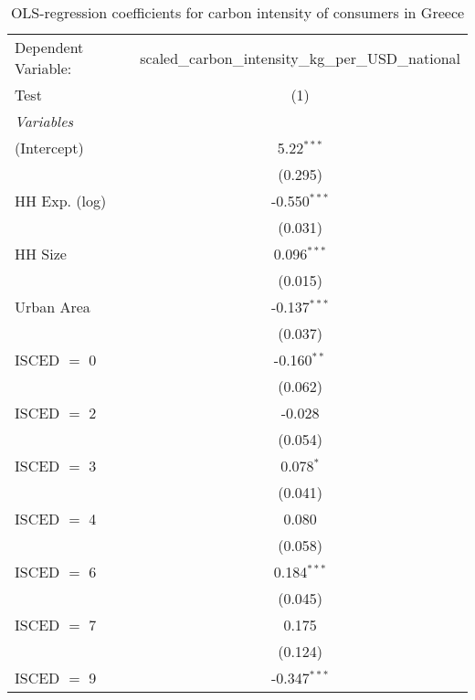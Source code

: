 
\begin{table}[htbp!]
   \centering
   \small
   \begin{adjustbox}{width = 1\textwidth, max height = 0.95\textheight, center}
      \begin{threeparttable}[b]
         \caption{\label{tab:OLS_1_GRC} OLS-regression coefficients for carbon intensity of consumers in Greece}
         \begin{tabular}{lc}
            \tabularnewline \midrule \midrule
            Dependent Variable: & scaled\_carbon\_intensity\_kg\_per\_USD\_national\\        
            Test                & (1)\\  
            \midrule
            \emph{Variables}\\
            (Intercept)         & 5.22$^{***}$\\   
                                & (0.295)\\   
            HH Exp. (log)       & -0.550$^{***}$\\   
                                & (0.031)\\   
            HH Size             & 0.096$^{***}$\\   
                                & (0.015)\\   
            Urban Area          & -0.137$^{***}$\\   
                                & (0.037)\\   
            ISCED $=$ 0         & -0.160$^{**}$\\   
                                & (0.062)\\   
            ISCED $=$ 2         & -0.028\\   
                                & (0.054)\\   
            ISCED $=$ 3         & 0.078$^{*}$\\   
                                & (0.041)\\   
            ISCED $=$ 4         & 0.080\\   
                                & (0.058)\\   
            ISCED $=$ 6         & 0.184$^{***}$\\   
                                & (0.045)\\   
            ISCED $=$ 7         & 0.175\\   
                                & (0.124)\\   
            ISCED $=$ 9         & -0.347$^{***}$\\   

\end{tabular}
\end{threeparttable}
\end{adjustbox}
\end{table}
